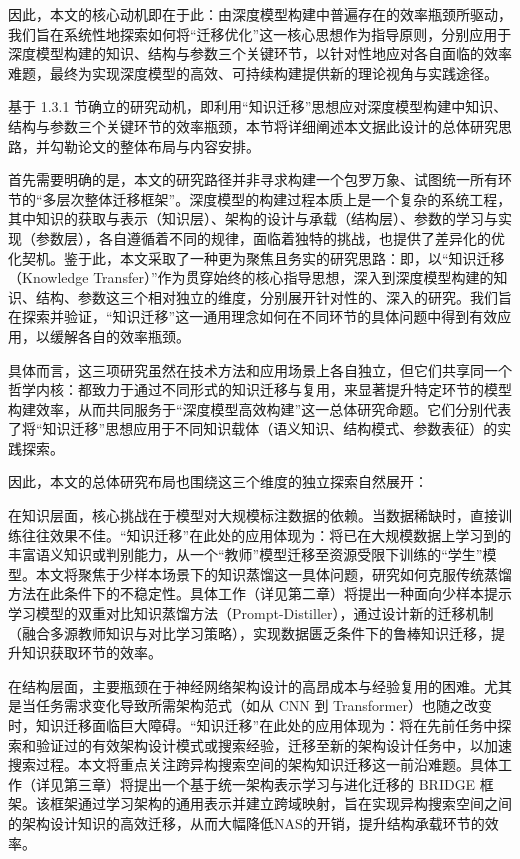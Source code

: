 \documentclass[../main.tex]{subfiles}
\begin{document}
因此，本文的核心动机即在于此：由深度模型构建中普遍存在的效率瓶颈所驱动，我们旨在系统性地探索如何将“迁移优化”这一核心思想作为指导原则，分别应用于深度模型构建的知识、结构与参数三个关键环节，以针对性地应对各自面临的效率难题，最终为实现深度模型的高效、可持续构建提供新的理论视角与实践途径。


基于 1.3.1 节确立的研究动机，即利用“知识迁移”思想应对深度模型构建中知识、结构与参数三个关键环节的效率瓶颈，本节将详细阐述本文据此设计的总体研究思路，并勾勒论文的整体布局与内容安排。

首先需要明确的是，本文的研究路径并非寻求构建一个包罗万象、试图统一所有环节的“多层次整体迁移框架”。深度模型的构建过程本质上是一个复杂的系统工程，其中知识的获取与表示（知识层）、架构的设计与承载（结构层）、参数的学习与实现（参数层），各自遵循着不同的规律，面临着独特的挑战，也提供了差异化的优化契机。鉴于此，本文采取了一种更为聚焦且务实的研究思路：即，以“知识迁移（Knowledge Transfer）”作为贯穿始终的核心指导思想，深入到深度模型构建的知识、结构、参数这三个相对独立的维度，分别展开针对性的、深入的研究。我们旨在探索并验证，“知识迁移”这一通用理念如何在不同环节的具体问题中得到有效应用，以缓解各自的效率瓶颈。

具体而言，这三项研究虽然在技术方法和应用场景上各自独立，但它们共享同一个哲学内核：都致力于通过不同形式的知识迁移与复用，来显著提升特定环节的模型构建效率，从而共同服务于“深度模型高效构建”这一总体研究命题。它们分别代表了将“知识迁移”思想应用于不同知识载体（语义知识、结构模式、参数表征）的实践探索。

因此，本文的总体研究布局也围绕这三个维度的独立探索自然展开：

在知识层面，核心挑战在于模型对大规模标注数据的依赖。当数据稀缺时，直接训练往往效果不佳。“知识迁移”在此处的应用体现为：将已在大规模数据上学习到的丰富语义知识或判别能力，从一个“教师”模型迁移至资源受限下训练的“学生”模型。本文将聚焦于少样本场景下的知识蒸馏这一具体问题，研究如何克服传统蒸馏方法在此条件下的不稳定性。具体工作（详见第二章）将提出一种面向少样本提示学习模型的双重对比知识蒸馏方法（Prompt-Distiller），通过设计新的迁移机制（融合多源教师知识与对比学习策略），实现数据匮乏条件下的鲁棒知识迁移，提升知识获取环节的效率。

在结构层面，主要瓶颈在于神经网络架构设计的高昂成本与经验复用的困难。尤其是当任务需求变化导致所需架构范式（如从 CNN 到 Transformer）也随之改变时，知识迁移面临巨大障碍。“知识迁移”在此处的应用体现为：将在先前任务中探索和验证过的有效架构设计模式或搜索经验，迁移至新的架构设计任务中，以加速搜索过程。本文将重点关注跨异构搜索空间的架构知识迁移这一前沿难题。具体工作（详见第三章）将提出一个基于统一架构表示学习与进化迁移的 BRIDGE 框架。该框架通过学习架构的通用表示并建立跨域映射，旨在实现异构搜索空间之间的架构设计知识的高效迁移，从而大幅降低NAS的开销，提升结构承载环节的效率。
\end{document}
